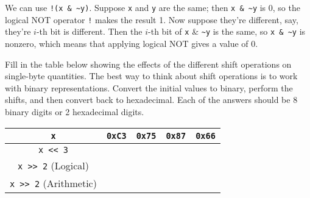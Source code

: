 \documentclass[12pt]{article}
\newenvironment{ex}[2][Exercise]{\begin{trivlist}
		\item[\hskip \labelsep {\bfseries #1}\hskip \labelsep {\bfseries #2.}]}{\end{trivlist}}
\newenvironment{sol}[1][Solution]{\begin{trivlist}
		\item[\hskip \labelsep {\bfseries #1:}]}{\end{trivlist}}
\begin{document}
\begin{sol}
	We can use \texttt{!(x \& \~{}y)}. Suppose \texttt{x} and \texttt{y} are the same;
	then \texttt{x \& \~{}y} is 0, so the logical NOT operator \texttt{!} makes the result
	1. Now suppose they're different, say, they're $i$-th bit is different. Then
	the $i$-th bit of \texttt{x} \& \texttt{\~{}y} is the same, so \texttt{x \& \~{}y} is
	nonzero, which means that applying logical NOT gives a value of 0.
\end{sol}

\begin{ex}{2.16}
	Fill in the table below showing the effects of the different shift operations on
	single-byte quantities. The best way to think about shift operations is to work
	with binary representations. Convert the initial values to binary, perform the
	shifts, and then convert back to hexadecimal. Each of the answers should be 8
	binary digits or 2 hexadecimal digits.
	\begin{center}
		\begin{tabular}{c|cccc}
			\texttt{x} & \texttt{0xC3} & \texttt{0x75} & \texttt{0x87} & \texttt{0x66} \\
			\hline
			\texttt{x << 3} \\
			\texttt{x >> 2} (Logical) \\
			\texttt{x >> 2} (Arithmetic)
		\end{tabular}
	\end{center}
\end{ex}
\end{document}
